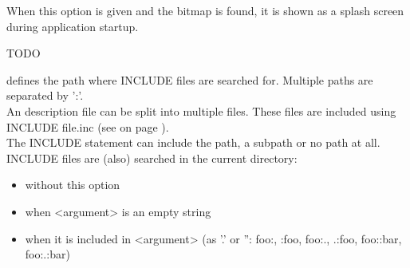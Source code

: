 \begin{description}
  When this option is given and the bitmap is found, it is shown as a splash screen during application startup.
%
\item[\texttt{--}rolefile <argument>]
  TODO
%
\item[\texttt{--}includePath <argument>] defines the path where INCLUDE files are searched for.
  Multiple paths are separated by ':'. \\
  An \INTENS{} description file can be split into multiple files. These files are included using \\
  INCLUDE file.inc (see 
  on page \pageref{sec:opexamples:messagequeue:publishsubscribe}). \\
  The INCLUDE statement can include the path, a subpath or no path at all. \\
  INCLUDE files are (also) searched in the current directory:
  \begin{itemize}
  \item without this option
  \item when <argument> is an empty string
  \item when it is included in <argument> (as '.' or '': foo:, :foo, foo:., .:foo, foo::bar, foo:.:bar)
  \end{itemize}


\end{description}
